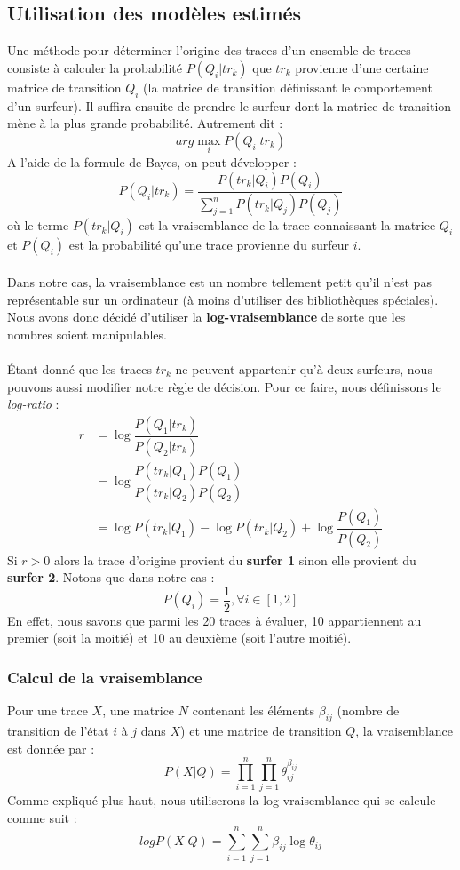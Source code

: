 \documentclass[a4paper,titlepage]{report}
\begin{document}
\subsection{Utilisation des modèles estimés}
\label{ssec:util_esti}
Une méthode pour déterminer l'origine des traces d'un ensemble de traces consiste à calculer la probabilité $P(Q_i|tr_k)$ que $tr_k$ provienne d'une certaine matrice de transition $Q_i$ (la matrice de transition définissant le comportement d'un surfeur). Il suffira ensuite de prendre le surfeur dont la matrice de transition mène à la plus grande probabilité. Autrement dit : 
\[
arg \max\limits_i P(Q_i|tr_k)
\]
A l'aide de la formule de Bayes, on peut développer : 
\[
P(Q_i|tr_k) = \dfrac{P(tr_k|Q_i) P(Q_i)}{\sum\limits_{j = 1}^n P(tr_k|Q_j) P(Q_j)}
\]
où le terme $P(tr_k|Q_i)$ est la vraisemblance de la trace connaissant la matrice $Q_i$ et $P(Q_i)$ est la probabilité qu'une trace provienne du surfeur $i$.
\paragraph{}
Dans notre cas, la vraisemblance est un nombre tellement petit qu'il n'est pas représentable sur un ordinateur (à moins d'utiliser des bibliothèques spéciales). Nous avons donc décidé d'utiliser la \textbf{log-vraisemblance} de sorte que les nombres soient manipulables. 
\paragraph{} 
Étant donné que les traces $tr_k$ ne peuvent appartenir qu'à deux surfeurs, nous pouvons aussi modifier notre règle de décision. Pour ce faire, nous définissons le \textit{log-ratio} :
\[
\begin{aligned}
r &= \log \dfrac{P(Q_1|tr_k)}{P(Q_2|tr_k)}\\
&= \log \dfrac{P(tr_k|Q_1) P(Q_1)}{P(tr_k|Q_2) P(Q_2)}\\
&= \log P(tr_k|Q_1) - \log P(tr_k|Q_2) + \log \dfrac{P(Q_1)}{P(Q_2)}
\end{aligned}
\]
Si $r > 0$ alors la trace d'origine provient du \textbf{surfer 1} sinon elle provient du \textbf{surfer 2}. Notons que dans notre cas :
\[ 
	P(Q_i) = \frac{1}{2}, \forall i \in [1,2]
\]
En effet, nous savons que parmi les 20 traces à évaluer, 10 appartiennent au premier (soit la moitié) et 10 au deuxième (soit l'autre moitié).  
\subsubsection{Calcul de la vraisemblance}
Pour une trace $X$, une matrice $N$ contenant les éléments $\beta_{ij}$ (nombre de transition de l'état $i$ à $j$ dans $X$) et une matrice de transition $Q$, la vraisemblance est donnée par : 
\[
P(X|Q) = \prod\limits_{i = 1}^n \prod\limits_{j = 1}^n \theta_{ij}^{\beta_{ij}}
\]
Comme expliqué plus haut, nous utiliserons la log-vraisemblance qui se calcule comme suit :
\[
log P(X|Q) = \sum\limits_{i = 1}^n\sum\limits_{j = 1}^n \beta_{ij} \log \theta_{ij}
\]
\end{document}
